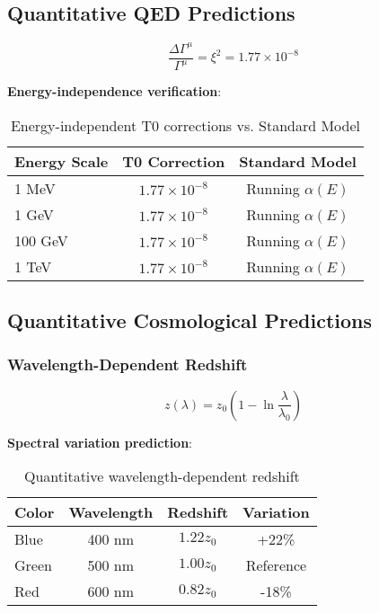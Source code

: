 \documentclass[12pt,a4paper]{article}
\newcommand{\xipar}{\xi}
\theoremstyle{definition}
\theoremstyle{remark}
\begin{document}
	\subsection{Quantitative QED Predictions}
	
	\begin{equation}
		\frac{\Delta\Gamma^{\mu}}{\Gamma^{\mu}} = \xipar^2 = 1.77 \times 10^{-8}
		\label{eq:quantitative_qed_correction}
	\end{equation}
	
	\textbf{Energy-independence verification}:
	\begin{table}[htbp]
		\centering
		\begin{tabular}{lcc}
			\toprule
			\textbf{Energy Scale} & \textbf{T0 Correction} & \textbf{Standard Model} \\
			\midrule
			1 MeV & $1.77 \times 10^{-8}$ & Running $\alpha(E)$ \\
			1 GeV & $1.77 \times 10^{-8}$ & Running $\alpha(E)$ \\
			100 GeV & $1.77 \times 10^{-8}$ & Running $\alpha(E)$ \\
			1 TeV & $1.77 \times 10^{-8}$ & Running $\alpha(E)$ \\
			\bottomrule
		\end{tabular}
		\caption{Energy-independent T0 corrections vs. Standard Model}
	\end{table}
	
	\subsection{Quantitative Cosmological Predictions}
	
	\subsubsection{Wavelength-Dependent Redshift}
	
	\begin{equation}
		z(\lambda) = z_0 \left(1 - \ln\frac{\lambda}{\lambda_0}\right)
		\label{eq:quantitative_redshift}
	\end{equation}
	
	\textbf{Spectral variation prediction}:
	\begin{table}[htbp]
		\centering
		\begin{tabular}{lccc}
			\toprule
			\textbf{Color} & \textbf{Wavelength} & \textbf{Redshift} & \textbf{Variation} \\
			\midrule
			Blue & 400 nm & $1.22 z_0$ & +22\% \\
			Green & 500 nm & $1.00 z_0$ & Reference \\
			Red & 600 nm & $0.82 z_0$ & -18\% \\
			\bottomrule
		\end{tabular}
		\caption{Quantitative wavelength-dependent redshift}
	\end{table}
	
\end{document}
